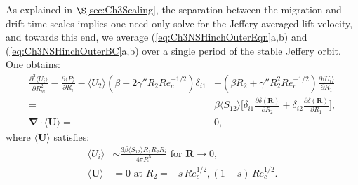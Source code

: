 \documentclass{jfm}
\begin{document}
As explained in $\S$\ref{sec:Ch3Scaling}, the separation between the migration and drift time scales implies one need only solve for the Jeffery-averaged lift velocity, and towards this end, we average (\ref{eq:Ch3NSHinchOuterEqn}a,b) and (\ref{eq:Ch3NSHinchOuterBC}a,b) over a single period of the stable Jeffery orbit. One obtains:
\begin{subequations}  \label{eq:Ch3NSHinchOuterTimeAvg}
	\begin{align} 
	\frac{\partial^2\langle U_i\rangle}{\partial R_m^2} -\frac{\partial\langle P\rangle}{\partial R_i}-\langle U_2\rangle(\beta+2\gamma''R_2 Re_c^{-1/2})\delta_{i1}&-(\beta R_2+\gamma''R_2^2 Re_c^{-1/2})\frac{\partial\langle U_i\rangle}{\partial R_1}\nonumber\\
	=&\beta\langle S_{12}\rangle\Big[ \delta_{i1}\frac{\partial\delta(\bm{R})}{\partial R_2}+\delta_{i2} \frac{\partial\delta(\bm{R})}{\partial R_1}\Big],\\
	\bm{\nabla}\cdot \langle\bm{U}\rangle=&0,
	\end{align} 
\end{subequations}
where $\langle\bm{U}\rangle$ satisfies:
\begin{subequations}
	\begin{align} 
	\langle U_i\rangle &\sim  \frac{3 \beta \langle S_{12}\rangle R_1 R_2 R_i}{4\pi R^5} \text{ for } \bm{R}\rightarrow 0,\\
	\langle\bm{U}\rangle&=0 \text{ at } R_2=-s\,Re_c^{1/2}, (1-s)\,Re_c^{1/2}.
	\end{align} \label{eq:Ch3NSHinchOuterTimeAvgBC}
\end{subequations}
\end{document}
